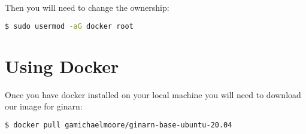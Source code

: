 Then you will need to change the ownership:
\begin{lstlisting}[language=bash]
$ sudo usermod -aG docker root
\end{lstlisting}

\section{Using Docker}

Once you have docker installed on your local machine you will need to download our image for ginarn:
\begin{lstlisting}[language=bash]
$ docker pull gamichaelmoore/ginarn-base-ubuntu-20.04
\end{lstlisting}








